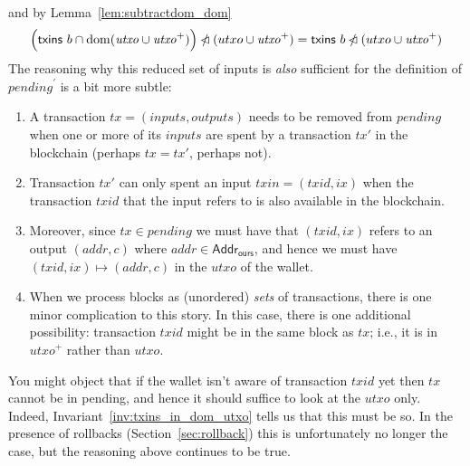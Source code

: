 \documentclass{article}
\newcommand{\restrictdom}{\lhd}
\newcommand{\subtractdom}{\mathbin{\slashed{\restrictdom}}}
\DeclareMathOperator{\dom}{dom}
\begin{document}
%
and by Lemma~\ref{lem:subtractdom_dom}
%
\begin{equation*}
  \Bigl( \mathsf{txins} ~ b \cap \dom (\mathit{utxo} \cup \mathit{utxo}^+) \Bigr) \subtractdom (utxo \cup \mathit{utxo}^+) \\
= \mathsf{txins} ~ b \subtractdom (utxo \cup \mathit{utxo}^+)
\end{equation*}
%
The reasoning why this reduced set of inputs is \emph{also} sufficient for
the definition of $\mathit{pending}^\prime$ is a bit more subtle:
%
\begin{enumerate}

\item A transaction $\mathit{tx} = (\mathit{inputs}, \mathit{outputs})$ needs to
be removed from $\mathit{pending}$ when one or more of its $\mathit{inputs}$ are
spent by a transaction $\mathit{tx}'$ in the blockchain (perhaps $\mathit{tx} =
\mathit{tx}'$, perhaps not).

\item Transaction $\mathit{tx}'$ can only spent an input $\mathit{\mathit{txin}} =
(\mathit{\mathit{txid}}, ix)$ when the transaction $\mathit{\mathit{txid}}$ that
the input refers to is also available in the blockchain.

\item Moreover, since $\mathit{tx} \in \mathit{pending}$ we must have that
$(\mathit{\mathit{txid}}, ix)$ refers to an output $(\mathit{addr}, c)$
where $\mathit{addr} \in \mathsf{Addr}_\mathsf{ours}$, and hence we must have
$(\mathit{\mathit{txid}}, ix) \mapsto (\mathit{addr}, c)$ in the
$\mathit{\mathit{utxo}}$ of the wallet.

\item When we process blocks as (unordered) \emph{sets} of transactions, there is
one minor complication to this story. In this case, there is one additional
possibility: transaction $\mathit{\mathit{txid}}$ might be in the same block as
$\mathit{tx}$; i.e., it is in $\mathit{utxo}^+$ rather than $\mathit{utxo}$.

\end{enumerate}

You might object that if the wallet isn't aware of transaction
$\mathit{\mathit{txid}}$ yet then $\mathit{tx}$ cannot be in pending, and hence
it should suffice to look at the $\mathit{utxo}$ only. Indeed,
Invariant~\ref{inv:txins_in_dom_utxo} tells us that this must be so. In the presence of
rollbacks (Section~\ref{sec:rollback}) this is unfortunately no longer the case,
but the reasoning above continues to be true.
\end{document}
